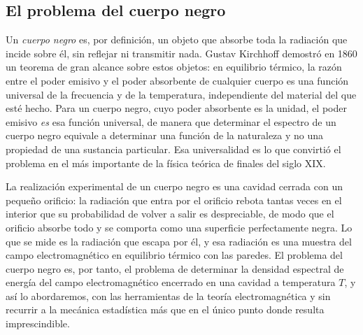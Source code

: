     \subsection{El problema del cuerpo negro}

        Un \textit{cuerpo negro} es, por definición, un objeto que absorbe toda la radiación que incide sobre él, sin reflejar ni transmitir nada. Gustav Kirchhoff demostró en 1860 un teorema de gran alcance sobre estos objetos: en equilibrio térmico, la razón entre el poder emisivo y el poder absorbente de cualquier cuerpo es una función universal de la frecuencia y de la temperatura, independiente del material del que esté hecho. Para un cuerpo negro, cuyo poder absorbente es la unidad, el poder emisivo \textit{es} esa función universal, de manera que determinar el espectro de un cuerpo negro equivale a determinar una función de la naturaleza y no una propiedad de una sustancia particular. Esa universalidad es lo que convirtió el problema en el más importante de la física teórica de finales del siglo XIX.

        La realización experimental de un cuerpo negro es una cavidad cerrada con un pequeño orificio: la radiación que entra por el orificio rebota tantas veces en el interior que su probabilidad de volver a salir es despreciable, de modo que el orificio absorbe todo y se comporta como una superficie perfectamente negra. Lo que se mide es la radiación que escapa por él, y esa radiación es una muestra del campo electromagnético en equilibrio térmico con las paredes. El problema del cuerpo negro es, por tanto, el problema de determinar la densidad espectral de energía del campo electromagnético encerrado en una cavidad a temperatura $T$, y así lo abordaremos, con las herramientas de la teoría electromagnética y sin recurrir a la mecánica estadística más que en el único punto donde resulta imprescindible.

